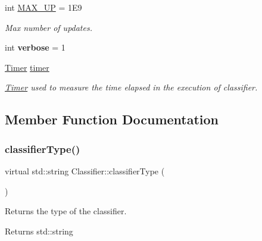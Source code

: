 \begin{DoxyCompactItemize}
\mbox{\label{class_classifier_abb8b95854801151e78a1d9f6a2173c22}} 
int \hyperlink{class_classifier_abb8b95854801151e78a1d9f6a2173c22}{M\+A\+X\+\_\+\+UP} = 1\+E9
\begin{DoxyCompactList}\small\item\em Max number of updates. \end{DoxyCompactList}\item 
\mbox{\label{class_classifier_a2b24f7f87ca8171ce07c888583646263}} 
int {\bfseries verbose} = 1
\item 
\mbox{\label{class_classifier_ae9d28253495ae8807d586faff951d46f}} 
\hyperlink{class_timer}{Timer} \hyperlink{class_classifier_ae9d28253495ae8807d586faff951d46f}{timer}
\begin{DoxyCompactList}\small\item\em \hyperlink{class_timer}{Timer} used to measure the time elapsed in the execution of classifier. \end{DoxyCompactList}\end{DoxyCompactItemize}


\subsection{Member Function Documentation}
\mbox{\label{class_classifier_a7bfe7cc88b851b4a7e7ec55b30dd844e}} 
\subsubsection{\texorpdfstring{classifier\+Type()}{classifierType()}}
{\footnotesize\ttfamily virtual std\+::string Classifier\+::classifier\+Type (\begin{DoxyParamCaption}{ }\end{DoxyParamCaption})\hspace{0.3cm}{\ttfamily [pure virtual]}}



Returns the type of the classifier. 

\begin{DoxyReturn}{Returns}
std\+::string 
\end{DoxyReturn}


